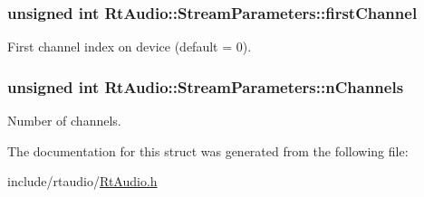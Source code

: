 \subsubsection[{first\+Channel}]{\setlength{\rightskip}{0pt plus 5cm}unsigned int Rt\+Audio\+::\+Stream\+Parameters\+::first\+Channel}\hypertarget{struct_rt_audio_1_1_stream_parameters_ad4b4503782653ec93c83328c46abe50c}{}\label{struct_rt_audio_1_1_stream_parameters_ad4b4503782653ec93c83328c46abe50c}
First channel index on device (default = 0). 
\subsubsection[{n\+Channels}]{\setlength{\rightskip}{0pt plus 5cm}unsigned int Rt\+Audio\+::\+Stream\+Parameters\+::n\+Channels}\hypertarget{struct_rt_audio_1_1_stream_parameters_a88a10091b6e284e21235cc6f25332ebd}{}\label{struct_rt_audio_1_1_stream_parameters_a88a10091b6e284e21235cc6f25332ebd}
Number of channels. 

The documentation for this struct was generated from the following file\+:\begin{DoxyCompactItemize}
\item 
include/rtaudio/\hyperlink{_rt_audio_8h}{Rt\+Audio.\+h}\end{DoxyCompactItemize}
